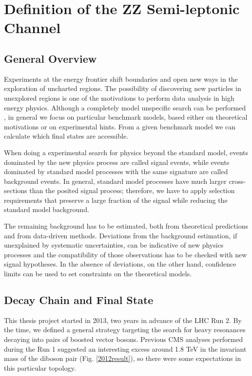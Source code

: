 \chapter{Definition of the ZZ Semi-leptonic Channel}
\section{General Overview}

Experiments at the energy frontier shift boundaries and open new ways in the exploration of uncharted regions. The possibility of discovering new particles in unexplored regions is one of the motivations to perform data analysis in high energy physics. Although a completely model unspecific search can be performed \cite{CMS:2017yoc}, in general we focus on particular benchmark models, based either on theoretical motivations or on experimental hints. From a given benchmark model we can calculate which final states are accessible.%

When doing a experimental search for physics beyond the standard model, events dominated by the new physics process are called signal events, while events dominated by standard model processes with the same signature are called background events. In general, standard model processes have much larger cross-sections than the posited signal process; therefore, we have to apply selection requirements that preserve a large fraction of the signal while reducing the standard model background. 

The remaining background has to be estimated, both from theoretical predictions and from data-driven methods. Deviations from the background estimation, if unexplained by systematic uncertainties, can be indicative of new physics processes and the compatibility of those observations has to be checked with new signal hypotheses. In the absence of deviations, on the other hand, confidence limits can be used to set constraints on the theoretical models. 

\section{Decay Chain and Final State}

This thesis project started in 2013, two years in advance of the LHC Run 2. By the time, we defined a general strategy targeting the search for heavy resonances decaying into pairs of boosted vector bosons. Previous CMS analyses performed during the Run 1 \cite{Khachatryan:2014gha} suggested an interesting excess around 1.8 TeV in the invariant mass of the diboson pair (Fig. \ref{2012result}), so there were some expectations in this particular topology.   

